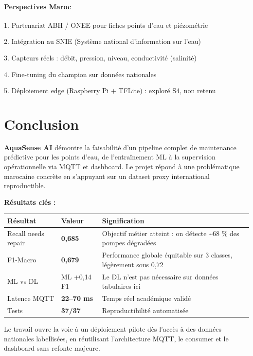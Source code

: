 \documentclass[11pt,a4paper]{report}
\begin{document}
\subsubsection{Perspectives Maroc}



1. Partenariat ABH / ONEE pour fiches points d'eau et piézométrie

2. Intégration au SNIE (Système national d'information sur l'eau)

3. Capteurs réels : débit, pression, niveau, conductivité (salinité)

4. Fine-tuning du champion sur données nationales

5. Déploiement edge (Raspberry Pi + TFLite) : exploré S4, non retenu





\chapter{Conclusion}



\textbf{AquaSense AI} démontre la faisabilité d'un pipeline complet de maintenance prédictive pour les points d'eau, de l'entraînement ML à la supervision opérationnelle via MQTT et dashboard. Le projet répond à une problématique marocaine concrète en s'appuyant sur un dataset proxy international reproductible.



\textbf{Résultats clés :}



\begin{longtable}{@{}lll@{}}
\toprule
Résultat & Valeur & Signification \\
\midrule
Recall needs repair & \textbf{0,685} & Objectif métier atteint : on détecte \textasciitilde{}68 \% des pompes dégradées \\
F1-Macro & \textbf{0,679} & Performance globale équitable sur 3 classes, légèrement sous 0,72 \\
ML vs DL & ML +0,14 F1 & Le DL n'est pas nécessaire sur données tabulaires ici \\
Latence MQTT & \textbf{22–70 ms} & Temps réel académique validé \\
Tests & \textbf{37/37} & Reproductibilité automatisée \\
\bottomrule
\end{longtable}




Le travail ouvre la voie à un déploiement pilote dès l'accès à des données nationales labellisées, en réutilisant l'architecture MQTT, le consumer et le dashboard sans refonte majeure.
\end{document}

